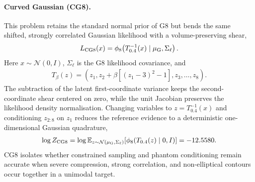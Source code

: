 \documentclass[pdflatex,sn-basic,icol]{sn-jnl}
\newcommand{\E}{\mathbb{E}}
\theoremstyle{plain}
\theoremstyle{definition}
\begin{document}
\paragraph{Curved Gaussian (CG8).}
This problem retains the standard normal prior of G8 but bends the same shifted, strongly correlated Gaussian likelihood with a volume-preserving shear,
\begin{align}
    L_{\rm CG8}(x) = \phi_8\!\left(T_{0.4}^{-1}(x)\mid\mu_{\rm G},\Sigma_\ell\right). \label{eq:cg8_likelihood}
\end{align}
Here $x\sim\mathcal{N}(0,I)$, $\Sigma_\ell$ is the G8 likelihood covariance, and
\begin{align*}
    T_\beta(z)=\left(z_1,z_2+\beta\left[(z_1-3)^2-1\right],z_3,\ldots,z_8\right).
\end{align*}
The subtraction of the latent first-coordinate variance keeps the second-coordinate shear centered on zero, while the unit Jacobian preserves the likelihood density normalisation.
Changing variables to $z=T_{0.4}^{-1}(x)$ and conditioning $z_{2:8}$ on $z_1$ reduces the reference evidence to a deterministic one-dimensional Gaussian quadrature,
\begin{align}
    \log Z_{\rm CG8}
    = \log\E_{z\sim\mathcal{N}(\mu_{\rm G},\Sigma_\ell)}
      \!\left[\phi_8(T_{0.4}(z)\mid0,I)\right]
    = -12.5580. \label{eq:cg8_evidence}
\end{align}
CG8 isolates whether constrained sampling and phantom conditioning remain accurate when severe compression, strong correlation, and non-elliptical contours occur together in a unimodal target.
\end{document}
